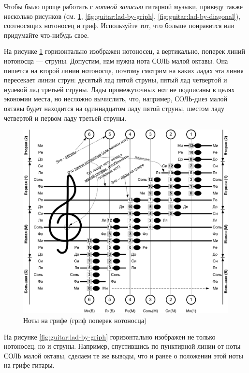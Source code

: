 Чтобы было проще работать с \emph{нотной записью} гитарной музыки, приведу также несколько рисунков (см. \ref{fig:guitar:lad-by-notes}, \ref{fig:guitar:lad-by-griph}, \ref{fig:guitar:lad-by-diagonal}), соотносящих нотоносец и гриф. Используйте тот, что больше понравится или придумайте что-нибудь свое.

На рисунке \ref{fig:guitar:lad-by-notes} горизонтально изображен нотоносец, а вертикально, поперек линий нотоносца --- струны. Допустим, нам нужна нота СОЛЬ малой октавы. Она пишется на второй линии нотоносца, поэтому смотрим на каких ладах эта линия пересекает линии струн: десятый лад пятой струны, пятый лад четвертой и нулевой лад третьей струны. Лады промежуточных нот не подписаны в целях экономии места, но несложно вычислить, что, например, СОЛЬ-диез малой октавы будет находится на одиннадцатом ладу пятой струны, шестом ладу четвертой и первом ладу третьей струны.
 
\begin{figure}[!ht]
    \centering
    \includegraphics[width=\textwidth]{fig/lad-by-notes} 
    \caption{Ноты на грифе (гриф поперек нотоносца)}\label{fig:guitar:lad-by-notes}
\end{figure} 

На рисунке \ref{fig:guitar:lad-by-griph} горизонтально изображен не только нотоносец, но и струны. Например, спустившись по пунктирной линии от ноты СОЛЬ малой октавы, сделаем те же выводы, что и ранее о положении этой ноты на грифе гитары. 

